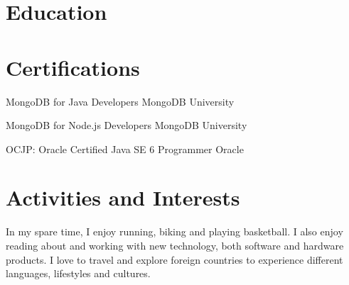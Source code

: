 \documentclass[12pt,a4paper]{moderncv}
\begin{document}
\section{Education}

\section{Certifications}

		{MongoDB for Java Developers}
		{MongoDB University}
		{}
		{}
		{}

		{MongoDB for Node.js Developers}
		{MongoDB University}
		{}
		{}
		{}

		{OCJP: Oracle Certified Java SE 6 Programmer}
		{Oracle}
		{}
		{}
		{}

\section{Activities and Interests}
In my spare time, I enjoy running, biking and playing basketball. I also enjoy reading about and
working with new technology, both software and hardware products. I love to travel and explore
foreign countries to experience different languages, lifestyles and cultures.

     
\end{document}
